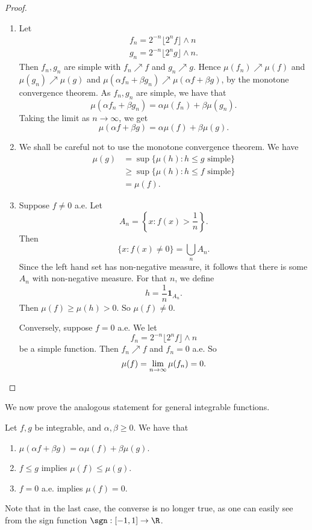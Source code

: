 \documentclass[a4paper]{article}
\begin{document}
\begin{proof}\leavevmode
  \begin{enumerate}
    \item Let
      \begin{align*}
        f_n = 2^{-n}\lfloor 2^n f\rfloor \wedge n\\
        g_n = 2^{-n}\lfloor 2^n g\rfloor \wedge n.
      \end{align*}
      Then $f_n, g_n$ are simple with $f_n \nearrow f$ and $g_n \nearrow g$. Hence $\mu(f_n) \nearrow \mu(f)$ and $\mu(g_n) \nearrow \mu(g)$ and $\mu(\alpha f_n + \beta g_n) \nearrow \mu(\alpha f + \beta g)$, by the monotone convergence theorem. As $f_n, g_n$ are simple, we have that
      \[
        \mu(\alpha f_n + \beta g_n) = \alpha \mu(f_n) + \beta \mu(g_n).
      \]
      Taking the limit as $n \to \infty$, we get
      \[
        \mu(\alpha f + \beta g) = \alpha \mu(f) + \beta \mu(g).
      \]
    \item We shall be careful not to use the monotone convergence theorem. We have
      \begin{align*}
        \mu(g) &= \sup\{\mu(h): h \leq g\text{ simple}\}\\
        &\geq \sup \{\mu(h): h \leq f\text{ simple}\}\\
        &= \mu(f).
      \end{align*}
    \item Suppose $f \not= 0$ a.e. Let
      \[
        A_n = \left\{x: f(x) > \frac{1}{n}\right\}.
      \]
      Then
      \[
        \{x: f(x) \not= 0\} = \bigcup_n A_n.
      \]
      Since the left hand set has non-negative measure, it follows that there is some $A_n$ with non-negative measure. For that $n$, we define
      \[
        h = \frac{1}{n} \mathbf{1}_{A_n}.
      \]
      Then $\mu(f) \geq \mu(h) > 0$. So $\mu(f) \not= 0$.

      Conversely, suppose $f = 0$ a.e. We let
      \[
        f_n = 2^{-n} \lfloor 2^n f\rfloor \wedge n
      \]
      be a simple function. Then $f_n \nearrow f$ and $f_n = 0$ a.e. So
      \[
        \mu(f) = \lim_{n \to \infty}\mu(f_n) = 0.\qedhere
      \]%
  \end{enumerate}
\end{proof}

We now prove the analogous statement for general integrable functions.
\begin{thm}
  Let $f, g$ be integrable, and $\alpha, \beta \geq 0$. We have that
  \begin{enumerate}
    \item $\mu(\alpha f + \beta g) = \alpha \mu(f) + \beta \mu(g)$.
    \item $f \leq g$ implies $\mu(f) \leq \mu(g)$.
    \item $f = 0$ a.e. implies $\mu(f) = 0$.
  \end{enumerate}
\end{thm}
Note that in the last case, the converse is no longer true, as one can easily see from the sign function $\sgn: [-1, 1] \to \R$.
\end{document}
